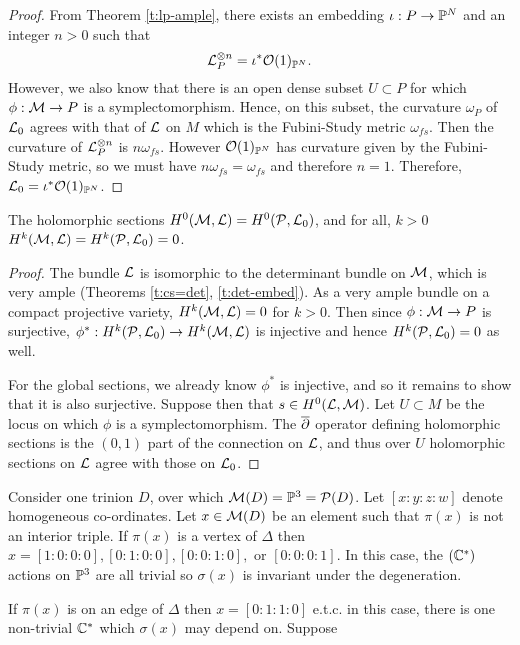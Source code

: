 \begin{proof}
	From Theorem \ref{t:lp-ample}, there exists an embedding $\iota:P\to\mathbb{P}^N$ and an integer $n>0$ such that
	\begin{equation}
	\mathcal{L}^{\otimes n}_P = \iota^\ast \mathcal{O}(1)_{\mathbb{P}^N}.
	\end{equation}
	However, we also know that there is an open dense subset $U \subset P$ for which $\phi:\mathcal{M}\to P$ is a symplectomorphism. Hence, on this subset, the curvature $\omega_P$ of $\mathcal{L}_0$ agrees with that of $\mathcal{L}$ on $M$ which is the Fubini-Study metric $\omega_{fs}$. Then the curvature of $\mathcal{L}^{\otimes n}_P$ is $n\omega_{fs}$. However $\mathcal{O}(1)_{\mathbb{P}^N}$ has curvature given by the Fubini-Study metric, so we must have $n\omega_{fs} = \omega_{fs}$ and therefore $n=1$. Therefore, $\mathcal{L}_0 = \iota^\ast \mathcal{O}(1)_{\mathbb{P}^N}$.
\end{proof}


\iffalse
\begin{theorem}
	The holomorphic sections $H^0(\mathcal{M},\mathcal{L}) = H^0(\mathcal{P}, \mathcal{L}_0)$, and for all, $k>0$ $H^k(\mathcal{M},\mathcal{L}) = H^k(\mathcal{P},\mathcal{L}_0) = 0$.
\end{theorem}
\begin{proof}
	The bundle $\mathcal{L}$ is isomorphic to the determinant bundle on $\mathcal{M}$, which is very ample (Theorems \ref{t:cs=det}, \ref{t:det-embed}). As a very ample bundle on a compact projective variety, $H^k(\mathcal{M},\mathcal{L}) = 0$ for $k>0$. Then since $\phi:\mathcal{M}\to P$ is surjective, $\phi^\ast:H^k(\mathcal{P},\mathcal{L}_0)\to H^k(\mathcal{M},\mathcal{L})$ is injective and hence $H^k(\mathcal{P},\mathcal{L}_0) =0$ as well.
	
	For the global sections, we already know $\phi^\ast$ is injective, and so it remains to show that it is also surjective. Suppose then that $s\in H^0(\mathcal{L},\mathcal{M})$. Let $U \subset M$ be the locus on which $\phi$ is a symplectomorphism. The $\overline{\partial}$ operator defining holomorphic sections is the $(0,1)$ part of the connection on $\mathcal{L}$, and thus over $U$ holomorphic sections on $\mathcal{L}$ agree with those on $\mathcal{L}_0$.  
\end{proof}

Consider one trinion $D$, over which $\mathcal{M}(D) = \mathbb{P}^3 = \mathcal{P}(D)$. Let $[x:y:z:w]$ denote homogeneous co-ordinates. Let $x\in \mathcal{M}(D)$ be an element such that $\pi(x)$ is not an interior triple. If $\pi(x)$ is a vertex of $\Delta$ then $x = [1:0:0:0], [0:1:0:0], [0:0:1:0],$ or  $[0:0:0:1]$. In this case, the $(\mathbb{C}^\ast)$ actions on $\mathbb{P}^3$ are all trivial so $\sigma(x)$ is invariant under the degeneration.

If $\pi(x)$ is on an edge of $\Delta$ then $x = [0:1:1:0]$ e.t.c. in this case, there is one non-trivial $\mathbb{C}^\ast$ which $\sigma(x)$ may depend on. Suppose 


